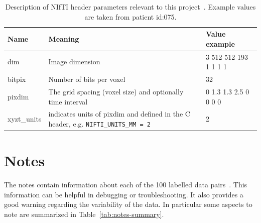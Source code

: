 \documentclass[11pt,twoside]{report}
\begin{document}
\begin{table}[ht]
  \centering
  \begin{tabular}{>{\raggedright}p{1.5cm}p{8cm}p{4cm}}
    \toprule
    \textbf{Name} & \textbf{Meaning}                                                                          & \textbf{Value example} \\
    \midrule
    dim           & Image dimension                                                                           & 3 512 512 193 1 1 1 1  \\
    bitpix        & Number of bits per voxel                                                                  & 32                     \\
    pixdim        & The grid spacing (voxel size) and optionally time interval                                & 0 1.3 1.3 2.5 0 0 0 0  \\
    xyzt\_units   & indicates units of pixdim and defined in the C header, e.g. \texttt{NIFTI\_UNITS\_MM = 2} & 2                      \\
    \bottomrule
  \end{tabular}
  \caption{Description of NIfTI header parameters relevant to this project~\cite{dicom-to-nifti-conversion, nifti-headers, nifti-data-format}. Example values are taken from patient id:075.}
 \label{tab:nifti-header}
\end{table}

\section{Notes}\label{sec:data-notes}

The notes contain information about each of the 100 labelled data pairs~\cite{AMLART-data}. This information can be helpful in debugging or troubleshooting. It also provides a good warning regarding the variability of the data. In particular some aspects to note are summarized in Table~\ref{tab:notes-summary}.
\end{document}
